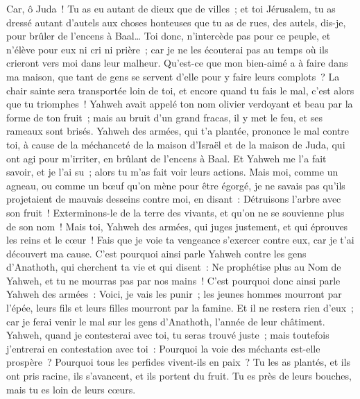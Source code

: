 \begin{multicols}{2}
Car, ô Juda~! Tu as eu autant de dieux que de villes~; et toi Jérusalem, tu as dressé autant d'autels aux choses honteuses que tu as de rues, des autels, dis-je, pour brûler de l'encens à Baal…
Toi donc, n'intercède pas pour ce peuple, et n'élève pour eux ni cri ni prière~; car je ne les écouterai pas au temps où ils crieront vers moi dans leur malheur.
Qu'est-ce que mon bien-aimé a à faire dans ma maison, que tant de gens se servent d'elle pour y faire leurs complots~? La chair sainte sera transportée loin de toi, et encore quand tu fais le mal, c'est alors que tu triomphes~!
Yahweh avait appelé ton nom olivier verdoyant et beau par la forme de ton fruit~; mais au bruit d'un grand fracas, il y met le feu, et ses rameaux sont brisés.
Yahweh des armées, qui t'a plantée, prononce le mal contre toi, à cause de la méchanceté de la maison d'Israël et de la maison de Juda, qui ont agi pour m'irriter, en brûlant de l'encens à Baal.
Et Yahweh me l'a fait savoir, et je l'ai su~; alors tu m'as fait voir leurs actions.
Mais moi, comme un agneau, ou comme un bœuf qu'on mène pour être égorgé, je ne savais pas qu'ils projetaient de mauvais desseins contre moi, en disant~: Détruisons l'arbre avec son fruit~! Exterminons-le de la terre des vivants, et qu'on ne se souvienne plus de son nom~!
Mais toi, Yahweh des armées, qui juges justement, et qui éprouves les reins et le cœur~! Fais que je voie ta vengeance s'exercer contre eux, car je t'ai découvert ma cause.
C'est pourquoi ainsi parle Yahweh contre les gens d'Anathoth, qui cherchent ta vie et qui disent~: Ne prophétise plus au Nom de Yahweh, et tu ne mourras pas par nos mains~!
C'est pourquoi donc ainsi parle Yahweh des armées~: Voici, je vais les punir~; les jeunes hommes mourront par l'épée, leurs fils et leurs filles mourront par la famine.
Et il ne restera rien d'eux~; car je ferai venir le mal sur les gens d'Anathoth, l'année de leur châtiment.
\VerseOne{}Yahweh, quand je contesterai avec toi, tu seras trouvé juste~; mais toutefois j'entrerai en contestation avec toi~: Pourquoi la voie des méchants est-elle prospère~? Pourquoi tous les perfides vivent-ils en paix~?
Tu les as plantés, et ils ont pris racine, ils s'avancent, et ils portent du fruit. Tu es près de leurs bouches, mais tu es loin de leurs cœurs.

\end{multicols}
